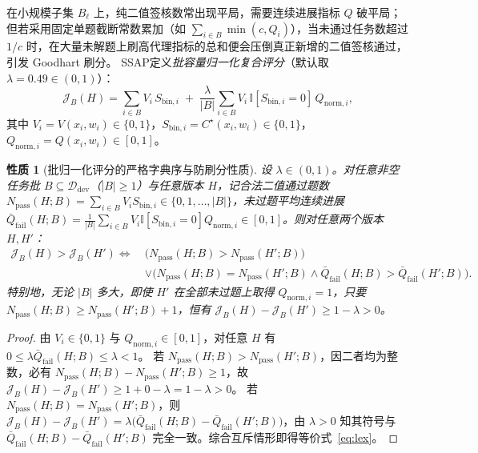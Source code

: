 \documentclass[UTF8,a4paper,10.5pt]{ctexart}
\newtheorem{prop}{性质}
\newcommand{\method}{SSAP}
\newcommand{\Ddev}{\mathcal{D}_{\mathrm{dev}}}
\newcommand{\Ind}{\mathbb{I}}
\begin{document}
在小规模子集 $B_\ell$ 上，纯二值签核数常出现平局，需要连续进展指标 $Q$ 破平局；但若采用固定单题截断常数累加（如 $\sum_{i\in B}\min(c, Q_i)$），当未通过任务数超过 $1/c$ 时，在大量未解题上刷高代理指标的总和便会压倒真正新增的二值签核通过，引发 Goodhart 刷分。
\method{}定义\emph{批容量归一化复合评分}（默认取 $\lambda=0.49\in(0,1)$）：
\begin{equation}
  \mathcal{J}_B(H) = \sum_{i\in B} V_i\, S_{\mathrm{bin},i}
  \;+\; \frac{\lambda}{|B|}\sum_{i\in B} V_i\,\Ind[S_{\mathrm{bin},i}=0]\,Q_{\mathrm{norm},i},
  \label{eq:jb}
\end{equation}
其中 $V_i=V(x_i,w_i)\in\{0,1\}$，$S_{\mathrm{bin},i}=C^\star(x_i,w_i)\in\{0,1\}$，$Q_{\mathrm{norm},i}=Q(x_i,w_i)\in[0,1]$。

\begin{prop}[批归一化评分的严格字典序与防刷分性质]
\label{prop:lex}
设 $\lambda\in(0,1)$。对任意非空任务批 $B\subseteq\Ddev$（$|B|\ge 1$）与任意版本 $H$，记合法二值通过题数 $N_{\mathrm{pass}}(H;B)=\sum_{i\in B}V_i S_{\mathrm{bin},i}\in\{0,1,\dots,|B|\}$，未过题平均连续进展 $\bar{Q}_{\mathrm{fail}}(H;B)=\frac{1}{|B|}\sum_{i\in B}V_i\Ind[S_{\mathrm{bin},i}=0]Q_{\mathrm{norm},i}\in[0,1]$。则对任意两个版本 $H,H'$：
\begin{equation}
\begin{aligned}
  \mathcal{J}_B(H) > \mathcal{J}_B(H') \iff\ &
  \bigl(N_{\mathrm{pass}}(H;B) > N_{\mathrm{pass}}(H';B)\bigr) \\
  &\lor \bigl(N_{\mathrm{pass}}(H;B) = N_{\mathrm{pass}}(H';B) \land \bar{Q}_{\mathrm{fail}}(H;B) > \bar{Q}_{\mathrm{fail}}(H';B)\bigr).
\end{aligned}
\label{eq:lex}
\end{equation}
特别地，无论 $|B|$ 多大，即使 $H'$ 在全部未过题上取得 $Q_{\mathrm{norm},i}=1$，只要 $N_{\mathrm{pass}}(H;B)\ge N_{\mathrm{pass}}(H';B)+1$，恒有 $\mathcal{J}_B(H)-\mathcal{J}_B(H')\ge 1-\lambda > 0$。
\end{prop}
\begin{proof}
由 $V_i\in\{0,1\}$ 与 $Q_{\mathrm{norm},i}\in[0,1]$，对任意 $H$ 有 $0\le \lambda\bar{Q}_{\mathrm{fail}}(H;B)\le\lambda<1$。
若 $N_{\mathrm{pass}}(H;B)>N_{\mathrm{pass}}(H';B)$，因二者均为整数，必有 $N_{\mathrm{pass}}(H;B)-N_{\mathrm{pass}}(H';B)\ge 1$，故 $\mathcal{J}_B(H)-\mathcal{J}_B(H')\ge 1 + 0 - \lambda = 1-\lambda > 0$。
若 $N_{\mathrm{pass}}(H;B)=N_{\mathrm{pass}}(H';B)$，则 $\mathcal{J}_B(H)-\mathcal{J}_B(H')=\lambda\bigl(\bar{Q}_{\mathrm{fail}}(H;B)-\bar{Q}_{\mathrm{fail}}(H';B)\bigr)$，由 $\lambda>0$ 知其符号与 $\bar{Q}_{\mathrm{fail}}(H;B)-\bar{Q}_{\mathrm{fail}}(H';B)$ 完全一致。综合互斥情形即得等价式~\eqref{eq:lex}。
\end{proof}
\end{document}
